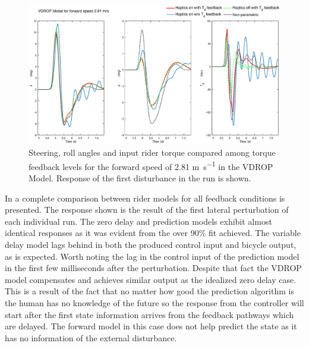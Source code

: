 \begin{figure}[!h]
    \centering
    \captionsetup{justification=centering,margin=2cm}

    \includegraphics[width=\textwidth]{images/fb_compare_plots/ROP_fb_compare28.eps}
        \caption{Steering, roll angles and input rider torque compared among torque feedback levels  for the forward speed of 2.81 \si{\meter\per\second} in the VDROP Model. Response of the first disturbance in the run is shown.}
    \label{fig:paper10}
\end{figure}

In   a complete comparison between rider models for all feedback conditions is presented. The response shown is the result of the first lateral perturbation of each individual run. The zero delay and prediction models exhibit almost identical responses as it was evident from the over 90\% fit achieved. The variable delay model lags behind in both the produced control input and bicycle output, as is expected. Worth noting the lag in the control input of the prediction model in the first few milliseconds after the perturbation. Despite that fact the VDROP model compensates and achieves similar output as the idealized zero delay case. This is a result of the fact that no matter how good the prediction algorithm is the human has no knowledge of the future so the response from the controller will start after the first state information arrives from the feedback pathways which are delayed. The forward model in this case does not help predict the state as it has no information of the external disturbance. 






